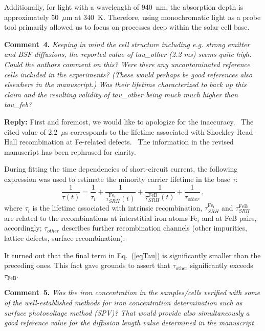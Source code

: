 \documentclass{WileyMSP-template}
\begin{document}
Additionally, for light with a wavelength of 940~nm, the absorption depth is approximately 50~$\mu$m at 340~K.
Therefore, using monochromatic light as a probe tool primarily allowed us to focus on processes deep within the solar cell base.


\vspace{1cm}
\noindent
\textcolor[rgb]{0.00,0.50,1.00}{\textbf{Comment~4.}}
\emph{Keeping in mind the cell structure including e.g. strong emitter and BSF diffusions,
the reported value of tau\_other (2.2 ms) seems quite high.
Could the authors comment on this?
Were there any uncontaminated reference cells included in the experiments?
(These would perhaps be good references also elsewhere in the manuscript.)
Was their lifetime characterized to back up this claim and the resulting validity of tau\_other being much much higher than tau\_feb?
}


\noindent
\textcolor[rgb]{0.51,0.00,0.00}{\textbf{Reply:}}
First and foremost, we would like to apologize for the inaccuracy. 
The cited value of 2.2~$\mu$s corresponds to the lifetime associated with Shockley-Read–Hall recombination at Fe-related defects. 
The information in the revised manuscript has been rephrased for clarity.

During fitting the time dependencies of short-circuit current,
the following expression was used to estimate the minority carrier lifetime in the base $\tau$:
\begin{equation}
\label{eqTau}
\frac{1}{\tau(t)}=\frac{1}{\tau_i}+\frac{1}{\tau_{SRH}^{\mathrm{Fe_i}}(t)}
+\frac{1}{\tau_{SRH}^\mathrm{FeB}(t)}+\frac{1}{\tau_{other}}\,,
\end{equation}
where
$\tau_i$ is the lifetime associated with intrinsic recombination,
$\tau_{SRH}^{\mathrm{Fe_i}}$ and $\tau_{SRH}^\mathrm{FeB}$ are related to the recombinations at interstitial iron atoms Fe$_i$ and at FeB pairs, accordingly;
$\tau_{other}$ describes further recombination channels
(other impurities, lattice defects, surface recombination).

It turned out that the final term in Eq.~(\ref{eqTau}) is significantly smaller than the preceding ones.
This fact gave grounds to assert that $\tau_\mathrm{other}$ significantly exceeds $\tau_\mathrm{FeB}$.





\vspace{1cm}
\noindent
\textcolor[rgb]{0.00,0.50,1.00}{\textbf{Comment~5.}}
\emph{
Was the iron concentration in the samples/cells verified with some of the well-established methods
for iron concentration determination such as surface photovoltage method (SPV)?
That would provide also simultaneously a good reference value for the diffusion length value determined in the manuscript.
}
\end{document}
